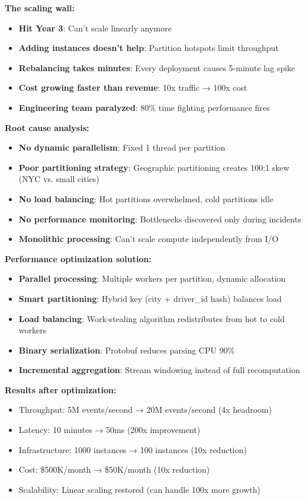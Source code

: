 \textbf{The scaling wall:}
\begin{itemize}
    \item \textbf{Hit Year 3}: Can't scale linearly anymore
    \item \textbf{Adding instances doesn't help}: Partition hotspots limit throughput
    \item \textbf{Rebalancing takes minutes}: Every deployment causes 5-minute lag spike
    \item \textbf{Cost growing faster than revenue}: 10x traffic → 100x cost
    \item \textbf{Engineering team paralyzed}: 80\% time fighting performance fires
\end{itemize}

\textbf{Root cause analysis:}
\begin{itemize}
    \item \textbf{No dynamic parallelism}: Fixed 1 thread per partition
    \item \textbf{Poor partitioning strategy}: Geographic partitioning creates 100:1 skew (NYC vs. small cities)
    \item \textbf{No load balancing}: Hot partitions overwhelmed, cold partitions idle
    \item \textbf{No performance monitoring}: Bottlenecks discovered only during incidents
    \item \textbf{Monolithic processing}: Can't scale compute independently from I/O
\end{itemize}

\textbf{Performance optimization solution:}
\begin{itemize}
    \item \textbf{Parallel processing}: Multiple workers per partition, dynamic allocation
    \item \textbf{Smart partitioning}: Hybrid key (city + driver\_id hash) balances load
    \item \textbf{Load balancing}: Work-stealing algorithm redistributes from hot to cold workers
    \item \textbf{Binary serialization}: Protobuf reduces parsing CPU 90\%
    \item \textbf{Incremental aggregation}: Stream windowing instead of full recomputation
\end{itemize}

\textbf{Results after optimization:}
\begin{itemize}
    \item Throughput: 5M events/second → 20M events/second (4x headroom)
    \item Latency: 10 minutes → 50ms (200x improvement)
    \item Infrastructure: 1000 instances → 100 instances (10x reduction)
    \item Cost: \$500K/month → \$50K/month (10x reduction)
    \item Scalability: Linear scaling restored (can handle 100x more growth)
\end{itemize}

